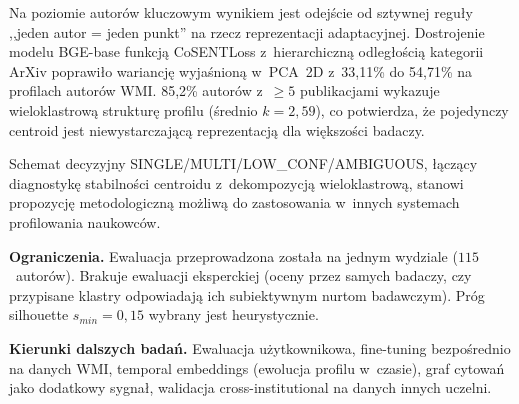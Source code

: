 \documentclass[a4paper,11pt,twocolumn]{article}
\begin{document}
Na poziomie autorów kluczowym wynikiem jest odejście od sztywnej reguły
,,jeden autor = jeden punkt'' na rzecz reprezentacji adaptacyjnej.
Dostrojenie modelu BGE-base funkcją CoSENTLoss z~hierarchiczną
odległością kategorii ArXiv poprawiło wariancję wyjaśnioną w~PCA~2D
z~33,11\% do 54,71\% na profilach autorów WMI. 85,2\% autorów
z~$\geq 5$ publikacjami wykazuje wieloklastrową strukturę profilu
(średnio $k=2{,}59$), co potwierdza, że pojedynczy centroid jest
niewystarczającą reprezentacją dla większości badaczy.

Schemat decyzyjny SINGLE/MULTI/LOW\_CONF/AMBIGUOUS, łączący diagnostykę
stabilności centroidu z~dekompozycją wieloklastrową, stanowi propozycję
metodologiczną możliwą do zastosowania w~innych systemach profilowania
naukowców.

\textbf{Ograniczenia.} Ewaluacja przeprowadzona została na jednym wydziale
($115$~autorów). Brakuje ewaluacji eksperckiej (oceny przez samych
badaczy, czy przypisane klastry odpowiadają ich subiektywnym nurtom
badawczym). Próg silhouette $s_{min}=0{,}15$ wybrany jest heurystycznie.

\textbf{Kierunki dalszych badań.} Ewaluacja użytkownikowa, fine-tuning
bezpośrednio na danych WMI, temporal embeddings (ewolucja profilu
w~czasie), graf cytowań jako dodatkowy sygnał, walidacja
cross-institutional na danych innych uczelni.
\end{document}
